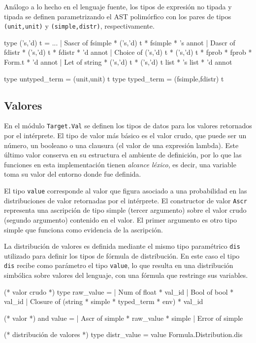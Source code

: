 Análogo a lo hecho en el lenguaje fuente, los tipos de expresión no tipada y
tipada se definen parametrizando el AST polimórfico con los pares de tipos
\verb|(unit,unit)| y \verb|(simple,distr)|, respectivamente.

\begin{ocamlblock}[caption={AST destino (extracto)}, label={lst:trgt-ast}]
  type ('s,'d) t =
  ...
| Sascr        of fsimple * ('s,'d) t * fsimple * 's annot
| Dascr        of fdistr  * ('s,'d) t * fdistr  * 'd annot
| Choice       of ('s,'d) t * ('s,'d) t * fprob * fprob * Form.t * 'd annot
| Let          of string  * ('s,'d) t * ('s,'d) t list * 's list * 'd annot

type untyped_term = (unit,unit) t
type typed_term   = (fsimple,fdistr) t
\end{ocamlblock}

\subsection{Valores}

En el módulo \verb|Target.Val| se definen los tipos de datos para los
valores retornados por el intérprete. El tipo de valor más básico es
el valor crudo, que puede ser un número, un booleano o una clausura
(el valor de una expresión lambda). Este último valor conserva en su
estructura el ambiente de definición, por lo que las funciones en esta
implementación tienen \emph{alcance léxico}, es decir, una variable toma
su valor del entorno donde fue definida.

El tipo \verb|value| corresponde al valor que figura asociado a una
probabilidad en las distribuciones de valor retornadas por el
intérprete. El constructor de valor \verb|Ascr| representa una
ascripción de tipo simple (tercer argumento) sobre el valor crudo
(segundo argumento) contenido en el valor. El primer argumento es otro tipo
simple que funciona como evidencia de la ascripción.

La distribución de valores es definida mediante el mismo tipo
paramétrico \verb|dis| utilizado para definir los
tipos de fórmula de distribución. En este caso el tipo \verb|dis|
recibe como parámetro el tipo \verb|value|, lo que resulta en una
distribución simbólica sobre valores del lenguaje, con una fórmula que
restringe sus variables.

\begin{ocamlblock}[caption={Valor Crudo, Valor, y Distribución de Valores}, label={lst:val}]
  (* valor crudo *)
  type raw_value = 
  | Num of float * val_id 
  | Bool of bool * val_id
  | Closure of (string * simple * typed_term * env) * val_id

  (* valor *)
  and value = 
  | Ascr of simple * raw_value * simple 
  | Error of simple
  
  (* distribución de valores *)
  type distr_value = value Formula.Distribution.dis
\end{ocamlblock}

